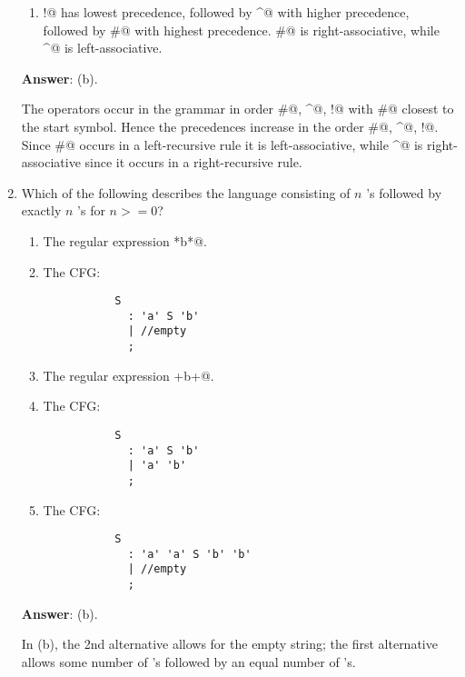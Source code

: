 \documentclass[12pt]{article}
\begin{document}
\begin{enumerate}
\begin{enumerate}
  \item \verb@!@ has lowest precedence, followed by \verb@^@ with
    higher precedence, followed by \verb@#@ with highest precedence.
    \verb@#@ is right-associative, while \verb@^@ is left-associative.

      
    
\end{enumerate}

\textbf{Answer}: (b).

The operators occur in the grammar in order \verb@#@, \verb@^@,
\verb@!@ with \verb@#@ closest to the start symbol.  Hence the
precedences increase in the order \verb@#@, \verb@^@, \verb@!@.  Since
\verb@#@ occurs in a left-recursive rule it is left-associative, while
\verb@^@ is right-associative since it occurs in a right-recursive
rule.

\item Which of the following describes the language consisting of
$n$ \verb@a@'s followed by exactly $n$ \verb@b@'s for $n >= 0$?

\begin{enumerate}

\item The regular expression \verb@a*b*@.

\item The CFG:
\begin{verbatim}
           S
             : 'a' S 'b'
             | //empty
             ;
\end{verbatim}

\item The regular expression \verb@a+b+@.

\item The CFG:
\begin{verbatim}
           S
             : 'a' S 'b'
             | 'a' 'b'
             ;
\end{verbatim}

\item The CFG:
\begin{verbatim}
           S
             : 'a' 'a' S 'b' 'b'
             | //empty
             ;
\end{verbatim}

\end{enumerate}

\textbf{Answer}: (b).

In (b), the 2nd alternative allows for the empty string; the
first alternative allows some number of \verb@a@'s followed by an
equal number of \verb@b@'s.


\end{enumerate}
\end{document}

